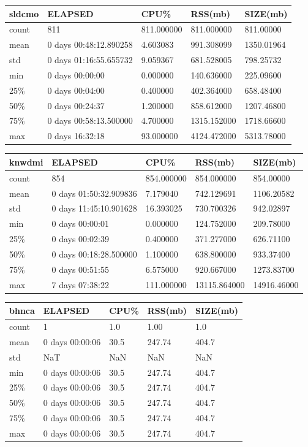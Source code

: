 \documentclass{article}
\begin{document}
\begin{tabular}{|l|l|l|l|l|}
\hline 
\hline sldcmo& ELAPSED&   CPU\%&  RSS(mb)&   SIZE(mb) \\
\hline count&    811& 811.000000&  811.000000&  811.00000 \\
\hline mean&  0 days 00:48:12.890258&  4.603083&  991.308099& 1350.01964 \\
\hline std&  0 days 01:16:55.655732&  9.059367&  681.528005&  798.25732 \\
\hline min&   0 days 00:00:00&  0.000000&  140.636000&  225.09600 \\
\hline 25\%&   0 days 00:04:00&  0.400000&  402.364000&  658.48400 \\
\hline 50\%&   0 days 00:24:37&  1.200000&  858.612000& 1207.46800 \\
\hline 75\%&  0 days 00:58:13.500000&  4.700000& 1315.152000& 1718.66600 \\
\hline max&   0 days 16:32:18&  93.000000& 4124.472000& 5313.78000 \\
\hline 
\end{tabular}
 
\begin{tabular}{|l|l|l|l|l|}
\hline 
\hline knwdmi& ELAPSED&   CPU\%&   RSS(mb)&  SIZE(mb) \\
\hline count&    854& 854.000000&  854.000000&  854.00000 \\
\hline mean&  0 days 01:50:32.909836&  7.179040&  742.129691&  1106.20582 \\
\hline std&  0 days 11:45:10.901628&  16.393025&  730.700326&  942.02897 \\
\hline min&   0 days 00:00:01&  0.000000&  124.752000&  209.78000 \\
\hline 25\%&   0 days 00:02:39&  0.400000&  371.277000&  626.71100 \\
\hline 50\%&  0 days 00:18:28.500000&  1.100000&  638.800000&  933.37400 \\
\hline 75\%&   0 days 00:51:55&  6.575000&  920.667000&  1273.83700 \\
\hline max&   7 days 07:38:22& 111.000000& 13115.864000& 14916.46000 \\
\hline 
\end{tabular}
 
\begin{tabular}{|l|l|l|l|l|}
\hline 
\hline bhnca&    ELAPSED& CPU\%& RSS(mb)& SIZE(mb) \\
\hline count&    1&  1.0&   1.00&  1.0 \\
\hline mean&  0 days 00:00:06& 30.5&  247.74&  404.7 \\
\hline std&    NaT&  NaN&  NaN&   NaN \\
\hline min&  0 days 00:00:06& 30.5&  247.74&  404.7 \\
\hline 25\%&  0 days 00:00:06& 30.5&  247.74&  404.7 \\
\hline 50\%&  0 days 00:00:06& 30.5&  247.74&  404.7 \\
\hline 75\%&  0 days 00:00:06& 30.5&  247.74&  404.7 \\
\hline max&  0 days 00:00:06& 30.5&  247.74&  404.7 \\
\hline 
\end{tabular}
 
\end{document}
